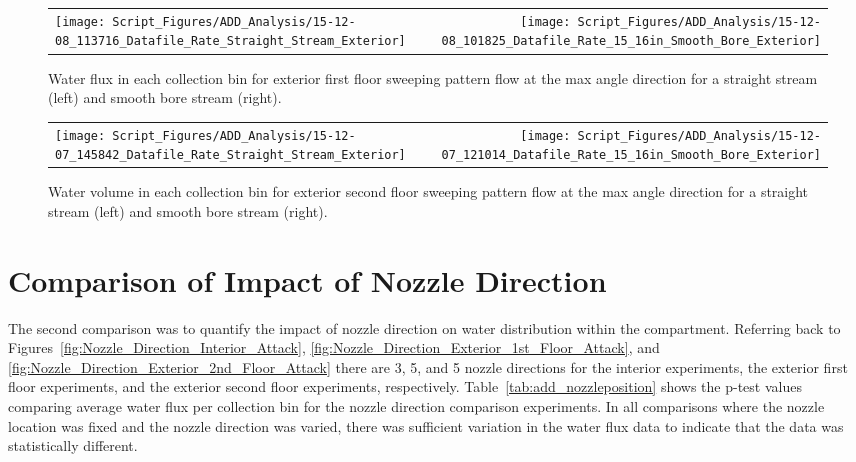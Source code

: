 \documentclass[12pt,oneside]{book}
\begin{document}
\begin{figure}[ht]
\begin{tabular*}{\textwidth}{lr}
\texttt{[image: Script\_Figures/ADD\_Analysis/15-12-08\_113716\_Datafile\_Rate\_Straight\_Stream\_Exterior]} &
\texttt{[image: Script\_Figures/ADD\_Analysis/15-12-08\_101825\_Datafile\_Rate\_15\_16in\_Smooth\_Bore\_Exterior]}
\end{tabular*}
\caption[Water Flux for Varying Exterior First Floor Sweeping Pattern Hose Stream Types]{Water flux in each collection bin for exterior first floor sweeping pattern flow at the max angle direction for a straight stream (left) and smooth bore stream (right).}
\label{fig:Exterior_FirstFloor_O_Varying_Nozzle}
\end{figure}

\begin{figure}[ht]
\begin{tabular*}{\textwidth}{lr}
\texttt{[image: Script\_Figures/ADD\_Analysis/15-12-07\_145842\_Datafile\_Rate\_Straight\_Stream\_Exterior]} &
\texttt{[image: Script\_Figures/ADD\_Analysis/15-12-07\_121014\_Datafile\_Rate\_15\_16in\_Smooth\_Bore\_Exterior]}
\end{tabular*}
\caption[Water Flux for Varying Exterior Second Floor Sweeping Pattern Hose Stream Types]{Water volume in each collection bin for exterior second floor sweeping pattern flow at the max angle direction for a straight stream (left) and smooth bore stream (right).}
\label{fig:Exterior_SecondFloor_O_Varying_Nozzle}
\end{figure}


\section{Comparison of Impact of Nozzle Direction}
\label{sec:direction}

The second comparison was to quantify the impact of nozzle direction on water distribution within the compartment. Referring back to Figures~\ref{fig:Nozzle_Direction_Interior_Attack}, \ref{fig:Nozzle_Direction_Exterior_1st_Floor_Attack}, and \ref{fig:Nozzle_Direction_Exterior_2nd_Floor_Attack} there are 3, 5, and 5 nozzle directions for the interior experiments, the exterior first floor experiments, and the exterior second floor experiments, respectively. Table~\ref{tab:add_nozzleposition} shows the p-test values comparing average water flux per collection bin  for the nozzle direction comparison experiments.  In all comparisons where the nozzle location was fixed and the nozzle direction was varied, there was sufficient variation in the water flux data to indicate that the data was statistically different. 
\end{document}
